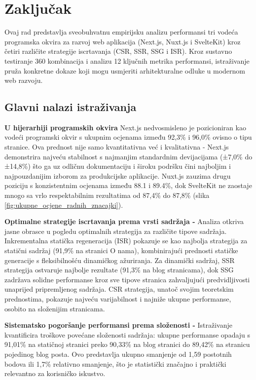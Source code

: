\section{Zaključak}

Ovaj rad predstavlja sveobuhvatnu empirijsku analizu performansi tri vodeća programska okvira za razvoj web aplikacija (Next.js, Nuxt.js i SvelteKit) kroz četiri različite strategije iscrtavanja (CSR, SSR, SSG i ISR). Kroz sustavno testiranje 360 kombinacija i analizu 12 ključnih metrika performansi, istraživanje pruža konkretne dokaze koji mogu usmjeriti arhitekturalne odluke u modernom web razvoju.

\subsection{Glavni nalazi istraživanja}

\textbf{U hijerarhiji programskih okvira} Next.js nedvosmisleno je pozicioniran kao vodeći programski okvir s ukupnim ocjenama između 92,3\% i 96,0\% ovisno o tipu stranice. Ova prednost nije samo kvantitativna već i kvalitativna - Next.js demonstrira najveću stabilnost s najmanjim standardnim devijacijama (±7,0\% do ±14,8\%) što ga uz odličnu dokumentaciju i široku podršku čini najboljim i najpouzdanijim izborom za produkcijske aplikacije. Nuxt.js zauzima drugu poziciju s konzistentnim ocjenama između 88.1 i 89.4\%, dok SvelteKit ne zaostaje mnogo sa vrlo respektabilnim rezultatima od 87,4\% do 87,8\% (slika \ref{fig:ukupne_ocjene_radnih_znacajki}).

\textbf{Optimalne strategije iscrtavanja prema vrsti sadržaja -} Analiza otkriva jasne obrasce u pogledu optimalnih strategija za različite tipove sadržaja. Inkrementalna statička regeneracija (ISR) pokazuje se kao najbolja strategija za statični sadržaj (91,9\% na stranici O nama), kombinirajući prednosti statičke generacije s fleksibilnošću dinamičkog ažuriranja. Za dinamički sadržaj, SSR strategija ostvaruje najbolje rezultate (91,3\% na blog stranicama), dok SSG zadržava solidne performanse kroz sve tipove stranica zahvaljujući predvidljivosti unaprijed pripremljenog sadržaja. CSR strategija, unatoč svojim teoretskim prednostima, pokazuje najveću varijabilnost i najniže ukupne performanse, osobito na složenijim stranicama.

\textbf{Sistematsko pogoršanje performansi prema složenosti -} Istraživanje kvantificira troškove povećane složenosti sadržaja: ukupne performanse opadaju s 91,01\% na statičnoj stranici preko 90,33\% na blog stranici do 89,42\% na stranicu pojedinog blog posta. Ovo predstavlja ukupno smanjenje od 1,59 postotnih bodova ili 1,7\% relativno smanjenje, što je statistički značajno i praktički relevantno za korisničko iskustvo.

